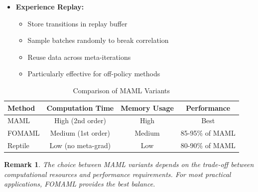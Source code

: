 \documentclass[12pt]{article}
\newtheorem{remark}{Remark}
\begin{document}
{{\begin{enumerate}
\begin{itemize}
					\item \textbf{Experience Replay:}
					\begin{itemize}
						\item Store transitions in replay buffer
						\item Sample batches randomly to break correlation
						\item Reuse data across meta-iterations
						\item Particularly effective for off-policy methods
					\end{itemize}
				\end{itemize}
			\end{enumerate}
			
			\begin{table}[H]
			\centering
			\caption{Comparison of MAML Variants}
			\begin{tabular}{@{}lccc@{}}
			\toprule
			\textbf{Method} & \textbf{Computation Time} & \textbf{Memory Usage} & \textbf{Performance} \\
			\midrule
			MAML & High (2nd order) & High & Best \\
			FOMAML & Medium (1st order) & Medium & 85-95\% of MAML \\
			Reptile & Low (no meta-grad) & Low & 80-90\% of MAML \\
			\bottomrule
			\end{tabular}
			\label{tab:maml_variants}
			\end{table}
			
			\begin{remark}
			The choice between MAML variants depends on the trade-off between computational resources and performance requirements. For most practical applications, FOMAML provides the best balance.
			\end{remark}
			
	}}
	
	
	\newpage
	
\end{document}

